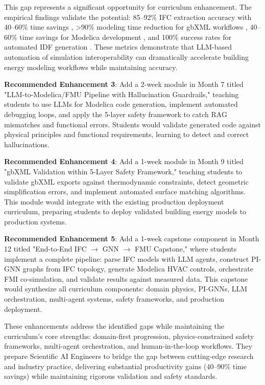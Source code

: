 \documentclass[12pt,a4paper]{article}
\begin{document}
This gap represents a significant opportunity for curriculum enhancement. The empirical findings validate the potential: 85--92\% IFC extraction accuracy with 40--60\% time savings \cite{ref120}, >90\% modeling time reduction for gbXML workflows \cite{ref121}, 40--60\% time savings for Modelica development \cite{ref122}, and 100\% success rates for automated IDF generation \cite{ref123}. These metrics demonstrate that LLM-based automation of simulation interoperability can dramatically accelerate building energy modeling workflows while maintaining accuracy.

\textbf{Recommended Enhancement 3}: Add a 2-week module in Month 7 titled "LLM-to-Modelica/FMU Pipeline with Hallucination Guardrails," teaching students to use LLMs for Modelica code generation, implement automated debugging loops, and apply the 5-layer safety framework to catch RAG mismatches and functional errors. Students would validate generated code against physical principles and functional requirements, learning to detect and correct hallucinations.

\textbf{Recommended Enhancement 4}: Add a 1-week module in Month 9 titled "gbXML Validation within 5-Layer Safety Framework," teaching students to validate gbXML exports against thermodynamic constraints, detect geometric simplification errors, and implement automated surface matching algorithms. This module would integrate with the existing production deployment curriculum, preparing students to deploy validated building energy models to production systems.

\textbf{Recommended Enhancement 5}: Add a 1-week capstone component in Month 12 titled "End-to-End IFC $\rightarrow$ GNN $\rightarrow$ FMU Capstone," where students implement a complete pipeline: parse IFC models with LLM agents, construct PI-GNN graphs from IFC topology, generate Modelica HVAC controls, orchestrate FMI co-simulation, and validate results against measured data. This capstone would synthesize all curriculum components: domain physics, PI-GNNs, LLM orchestration, multi-agent systems, safety frameworks, and production deployment.

These enhancements address the identified gaps while maintaining the curriculum's core strengths: domain-first progression, physics-constrained safety frameworks, multi-agent orchestration, and human-in-the-loop workflows. They prepare Scientific AI Engineers to bridge the gap between cutting-edge research and industry practice, delivering substantial productivity gains (40--90\% time savings) while maintaining rigorous validation and safety standards.
\end{document}
